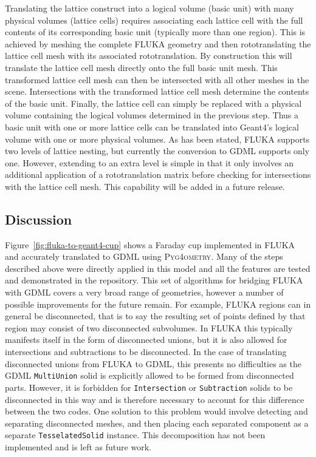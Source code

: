 \documentclass[final,5p,times,twocolumn]{elsarticle}
\newcommand{\pyinline}[1]{\lstinline[postbreak={}]{#1}}
\newcommand{\PYGEOMETRY}{\textsc{Pyg4ometry}}
\begin{document}
Translating the lattice construct into a logical volume (basic unit) with
many physical volumes (lattice cells) requires associating each lattice
cell with the full contents of its corresponding basic unit (typically more
than one region). This is achieved by meshing the complete FLUKA geometry
and then rototranslating the lattice cell mesh with its associated
rototranslation. By construction this will translate the lattice cell mesh
directly onto the full basic unit mesh. This transformed lattice cell mesh
can then be intersected with all other meshes in the scene.  Intersections
with the transformed lattice cell mesh determine the contents of the basic
unit.  Finally, the lattice cell can simply be replaced with a physical
volume containing the logical volumes determined in the previous step.
Thus a basic unit with one or more lattice cells can be translated into
Geant4's logical volume with one or more physical volumes. As has been
stated, FLUKA supports two levels of lattice nesting, but currently the
conversion to GDML supports only one. However, extending to an extra level
is simple in that it only involves an additional application of a
rototranslation matrix before checking for intersections with the lattice
cell mesh.  This capability will be added in a future release.

\subsection{Discussion}

Figure~\ref{fig:fluka-to-geant4-cup} shows a Faraday cup implemented in
FLUKA and accurately translated to GDML using \PYGEOMETRY{}.  Many of the
steps described above were directly applied in this model and all the
features are tested and demonstrated in the repository.  This set of
algorithms for bridging FLUKA with GDML covers a very broad range of
geometries, however a number of possible improvements for the future
remain.  For example, FLUKA regions can in general be disconnected, that is
to say the resulting set of points defined by that region may consist of
two disconnected subvolumes.  In FLUKA this typically manifests itself in
the form of disconnected unions, but it is also allowed for intersections
and subtractions to be disconnected.  In the case of translating
disconnected unions from FLUKA to GDML, this presents no difficulties as
the GDML \pyinline{MultiUnion} solid is explicitly allowed to be formed from
disconnected parts.  However, it is forbidden for \pyinline{Intersection} or
\pyinline{Subtraction} solids to be disconnected in this way and is
therefore necessary to account for this difference between the two codes.
One solution to this problem would involve detecting and separating
disconnected meshes, and then placing each separated component as a
separate \pyinline{TesselatedSolid} instance.  This decomposition has not
been implemented and is left as future work.
\end{document}
